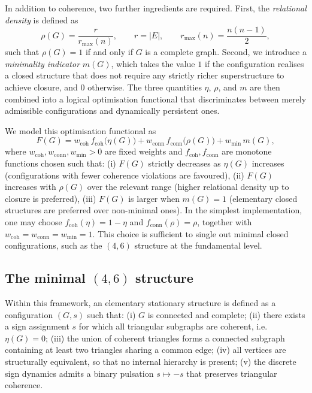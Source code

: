 \documentclass[12pt,a4paper]{article}
\begin{document}
In addition to coherence, two further ingredients are required. First, the \emph{relational density} is defined as
\[
  \rho(G) = \frac{r}{r_{\max}(n)},
  \qquad
  r = |E|,
  \qquad
  r_{\max}(n) = \frac{n(n-1)}{2},
\]
such that \(\rho(G)=1\) if and only if \(G\) is a complete graph. Second, we introduce a \emph{minimality indicator} \(m(G)\), which takes the value \(1\) if the configuration realises a closed structure that does not require any strictly richer superstructure to achieve closure, and \(0\) otherwise. The three quantities \(\eta\), \(\rho\), and \(m\) are then combined into a logical optimisation functional that discriminates between merely admissible configurations and dynamically persistent ones.\cite{Laubscher2026IntroPDL,Laubscher2026PDL_English}

We model this optimisation functional as
\[
  F(G)
  =
  w_{\text{coh}}\,f_{\text{coh}}\!\bigl(\eta(G)\bigr)
  +
  w_{\text{conn}}\,f_{\text{conn}}\!\bigl(\rho(G)\bigr)
  +
  w_{\min}\,m(G),
\]
where \(w_{\text{coh}},w_{\text{conn}},w_{\min}>0\) are fixed weights and \(f_{\text{coh}},f_{\text{conn}}\) are monotone functions chosen such that:
(i) \(F(G)\) strictly decreases as \(\eta(G)\) increases (configurations with fewer coherence violations are favoured),
(ii) \(F(G)\) increases with \(\rho(G)\) over the relevant range (higher relational density up to closure is preferred),
(iii) \(F(G)\) is larger when \(m(G)=1\) (elementary closed structures are preferred over non-minimal ones).
In the simplest implementation, one may choose \(f_{\text{coh}}(\eta)=1-\eta\) and \(f_{\text{conn}}(\rho)=\rho\), together with \(w_{\text{coh}}=w_{\text{conn}}=w_{\min}=1\). This choice is sufficient to single out minimal closed configurations, such as the \((4,6)\) structure at the fundamental level.\cite{Laubscher2026IntroPDL,Laubscher2026PDL_English}

\subsection{The minimal \texorpdfstring{\((4,6)\)}{(4,6)} structure}

Within this framework, an elementary stationary structure is defined as a configuration \((G,s)\) such that:
(i) \(G\) is connected and complete;
(ii) there exists a sign assignment \(s\) for which all triangular subgraphs are coherent, i.e. \(\eta(G)=0\);
(iii) the union of coherent triangles forms a connected subgraph containing at least two triangles sharing a common edge;
(iv) all vertices are structurally equivalent, so that no internal hierarchy is present;
(v) the discrete sign dynamics admits a binary pulsation \(s\mapsto -s\) that preserves triangular coherence.\cite{Laubscher2026IntroPDL,Laubscher2026PDL_English}
\end{document}
